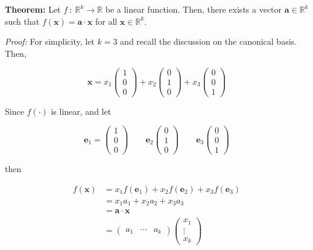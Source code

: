 \documentclass[11pt]{article}
\begin{document}
\textbf{Theorem:} Let \(f \: : \: \mathbb{R}^k \rightarrow \mathbb{R}\)
be a linear function. Then, there exists a vector
\(\mathbf{a}\in\mathbb{R}^k\) such that
\(f(\mathbf{x}) = \mathbf{a}\cdot\mathbf{x}\) for all
\(\mathbf{x}\in\mathbb{R}^k\).

\emph{Proof:} For simplicity, let \(k = 3\) and recall the discussion on
the canonical basis. Then,

\[
\mathbf{x} = x_1\begin{pmatrix} 1 \\ 0 \\ 0 \end{pmatrix} + x_2 \begin{pmatrix} 0 \\ 1 \\ 0 \end{pmatrix} + x_3 \begin{pmatrix} 0 \\ 0 \\ 1 \end{pmatrix}
\]

Since \(f(\cdot)\) is linear, and let

\[
\mathbf{e}_1 = \begin{pmatrix} 1 \\ 0 \\ 0 \end{pmatrix} \qquad \mathbf{e}_2 \begin{pmatrix} 0 \\ 1 \\ 0 \end{pmatrix} \qquad \mathbf{e}_3 \begin{pmatrix} 0 \\ 0 \\ 1 \end{pmatrix}
\]

then

\[
\begin{align*}
f(\mathbf{x}) &= x_1 f(\mathbf{e}_1) + x_2 f(\mathbf{e}_2) + x_3 f(\mathbf{e}_3) \\
& = x_1 a_1 + x_2 a_2 + x_3 a_3 \\
& = \mathbf{a}\cdot\mathbf{x} \\
& = \begin{pmatrix} a_1 & \cdots & a_k \end{pmatrix} \begin{pmatrix} x_1 \\ \vdots \\ x_k \end{pmatrix}
\end{align*}
\]
\end{document}
